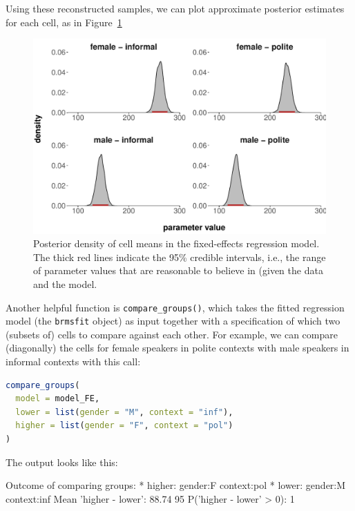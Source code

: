 \documentclass[nobib]{tufte-handout}
\begin{document}
\noindent Using these reconstructed samples, we can plot approximate posterior estimates for each cell, as in Figure~\ref{fig:Posteriors_cell_means}

\begin{figure}
  \centering
  \includegraphics[width=\textwidth]{pics/posterior_density_cell_means.pdf}
  \caption[Posteriors over cell means in fixed-effects model]{Posterior density of cell means
    in the fixed-effects regression model. The thick red lines indicate the 95\% credible
    intervals, i.e., the range of parameter values that are reasonable to believe in (given the data and the model.}
  \label{fig:Posteriors_cell_means}
\end{figure}


Another helpful function is \texttt{compare\_groups()}, which takes the fitted regression model (the \texttt{brmsfit} object) as input together with a specification of which two (subsets of) cells to compare
against each other. For example, we can compare (diagonally) the cells for female speakers in
polite contexts with male speakers in informal contexts with this call:

\begin{minipage}[]{1.3\textwidth}
\begin{lstlisting}[language=R]
compare_groups(
  model = model_FE, 
  lower = list(gender = "M", context = "inf"),
  higher = list(gender = "F", context = "pol")
)
\end{lstlisting}
\end{minipage}

\noindent The output looks like this:

\medskip

\begin{minipage}[]{\textwidth}
\begin{rc}
Outcome of comparing groups:
 * higher:  gender:F context:pol 
 * lower:   gender:M context:inf 
Mean 'higher - lower':  88.74 
95%
P('higher - lower' > 0):  1 
\end{rc}
\end{minipage}
\end{document}
